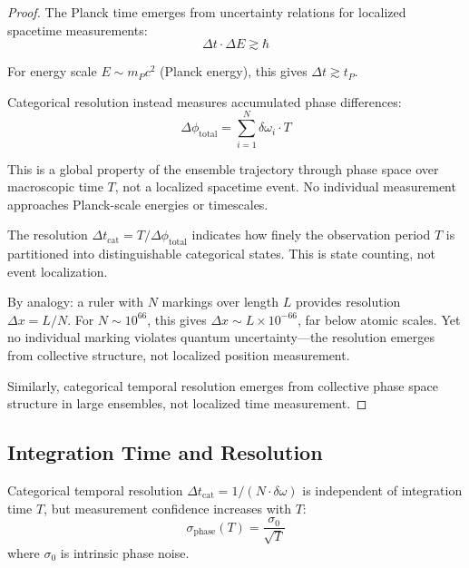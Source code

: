 \begin{proof}
The Planck time emerges from uncertainty relations for localized spacetime measurements:
\begin{equation}
\Delta t \cdot \Delta E \gtrsim \hbar
\end{equation}

For energy scale $E \sim m_P c^2$ (Planck energy), this gives $\Delta t \gtrsim t_P$.

Categorical resolution instead measures accumulated phase differences:
\begin{equation}
\Delta\phi_{\text{total}} = \sum_{i=1}^{N} \delta\omega_i \cdot T
\end{equation}

This is a global property of the ensemble trajectory through phase space over macroscopic time $T$, not a localized spacetime event. No individual measurement approaches Planck-scale energies or timescales.

The resolution $\Delta t_{\text{cat}} = T/\Delta\phi_{\text{total}}$ indicates how finely the observation period $T$ is partitioned into distinguishable categorical states. This is state counting, not event localization.

By analogy: a ruler with $N$ markings over length $L$ provides resolution $\Delta x = L/N$. For $N \sim 10^{66}$, this gives $\Delta x \sim L \times 10^{-66}$, far below atomic scales. Yet no individual marking violates quantum uncertainty—the resolution emerges from collective structure, not localized position measurement.

Similarly, categorical temporal resolution emerges from collective phase space structure in large ensembles, not localized time measurement.
\end{proof}

\subsection{Integration Time and Resolution}

\begin{proposition}
\label{prop:integration_scaling}
Categorical temporal resolution $\Delta t_{\text{cat}} = 1/(N \cdot \delta\omega)$ is independent of integration time $T$, but measurement confidence increases with $T$:
\begin{equation}
\sigma_{\text{phase}}(T) = \frac{\sigma_0}{\sqrt{T}}
\end{equation}
where $\sigma_0$ is intrinsic phase noise.
\end{proposition}

